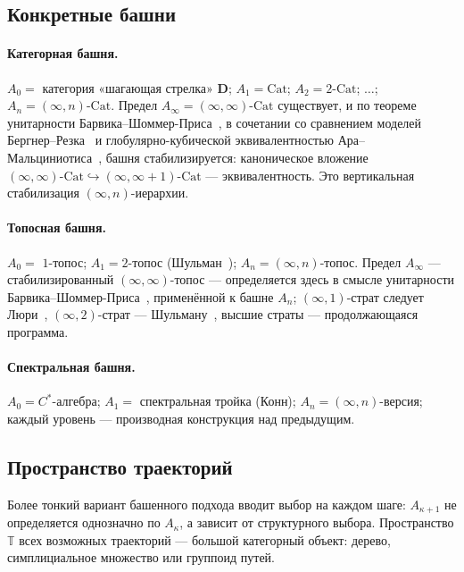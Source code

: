 \documentclass[11pt]{article}
\theoremstyle{plain}
\theoremstyle{definition}
\newcommand{\Cat}{\mathrm{Cat}}
\begin{document}
\subsection{Конкретные башни}

\paragraph{Категорная башня.} $A_0 = $ категория «шагающая стрелка» $\mathbf{D}$; $A_1 = \Cat$; $A_2 = 2\text{-}\Cat$; $\ldots$; $A_n = (\infty, n)$-$\Cat$. Предел $A_\infty = (\infty, \infty)$-$\Cat$ существует, и по теореме унитарности Барвика--Шоммер-Приса~\cite{BarwickSchommerPries2021}, в сочетании со сравнением моделей Бергнер--Резка~\cite{BergnerRezk2013} и глобулярно-кубической эквивалентностью Ара--Мальциниотиса~\cite{AraMaltsiniotis2017}, башня стабилизируется: каноническое вложение $(\infty, \infty)\text{-}\Cat \hookrightarrow (\infty, \infty+1)\text{-}\Cat$ — эквивалентность. Это вертикальная стабилизация $(\infty, n)$-иерархии.

\paragraph{Топосная башня.} $A_0 = $ $1$-топос; $A_1 = 2$-топос (Шульман~\cite{Shulman2008}); $A_n = (\infty, n)$-топос. Предел $A_\infty$ — стабилизированный $(\infty, \infty)$-топос — определяется здесь в смысле унитарности Барвика--Шоммер-Приса~\cite{BarwickSchommerPries2021}, применённой к башне $A_n$; $(\infty, 1)$-страт следует Люри~\cite{LurieHTT}, $(\infty, 2)$-страт — Шульману~\cite{Shulman2008}, высшие страты — продолжающаяся программа.

\paragraph{Спектральная башня.} $A_0 = C^*$-алгебра; $A_1 = $ спектральная тройка (Конн); $A_n = (\infty, n)$-версия; каждый уровень — производная конструкция над предыдущим.

\subsection{Пространство траекторий}

Более тонкий вариант башенного подхода вводит выбор на каждом шаге: $A_{\kappa+1}$ не определяется однозначно по $A_\kappa$, а зависит от структурного выбора. Пространство $\mathbb{T}$ всех возможных траекторий — большой категорный объект: дерево, симплициальное множество или группоид путей.
\end{document}
